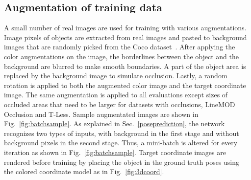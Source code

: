 \documentclass[10pt,twocolumn,letterpaper]{article}
\begin{document}
\subsection{Augmentation of training data} 
A small number of real images are used for training with various augmentations. Image pixels of objects are extracted from real images and pasted to background images that are randomly picked from the Coco dataset~\cite{lin2014mscoco}. After applying the color augmentations on the image, the borderlines between the object and the background are blurred to make smooth boundaries. A part of the object area is replaced by the background image to simulate occlusion. Lastly, a random rotation is applied to both the augmented color image and the target coordinate image. The same augmentation is applied to all evaluations except sizes of occluded areas that need to be larger for datasets with occlusions, LineMOD Occlusion and T-Less. Sample augmentated images are shown in Fig.~\ref{fig:batchsample}. As explained in Sec.~\ref{poseprediction}, the network recognizes two types of inputs, with background in the first stage and without background pixels in the second stage. Thus, a mini-batch is altered for every iteration as shown in Fig.~\ref{fig:batchsample}. Target coordinate images are rendered before training by placing the object in the ground truth poses using the colored coordinate model as in Fig.~\ref{fig:3dcoord}. 
\end{document}
